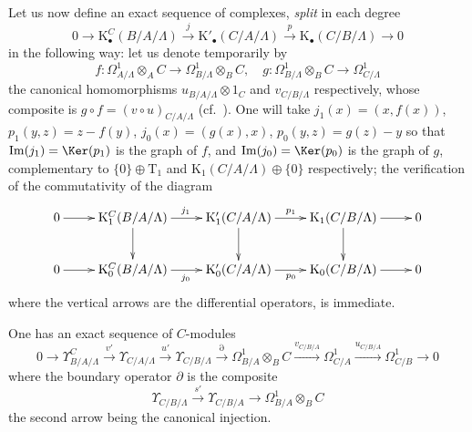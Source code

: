\begin{env}[20.6.16]
\label{0.20.6.16}
Let us now define an exact sequence of complexes, \emph{split} in each degree
\begin{equation}
\tag{20.6.16.1}
  \label{0.20.6.16.1}
  0\to\mathrm{K}^C_\bullet(B/A/\Lambda)\xrightarrow{j}\mathrm{K}'_\bullet(C/A/\Lambda)\xrightarrow{p}\mathrm{K}_\bullet(C/B/\Lambda)\to 0
\end{equation}
in the following way: let us denote temporarily by
\[
  f:\Omega^1_{A/\Lambda}\otimes_A C\to\Omega^1_{B/\Lambda}\otimes_B C, \quad
  g:\Omega^1_{B/\Lambda}\otimes_B C\to\Omega^1_{C/\Lambda}
\]
the canonical homomorphisms $u_{B/A/\Lambda}\otimes 1_C$ and $v_{C/B/\Lambda}$ respectively, whose composite is $g\circ f=(v\circ u)_{C/A/\Lambda}$ (cf.\ ).
One will take $j_1(x)=(x,f(x))$, $p_1(y,z)=z-f(y)$, $j_0(x)=(g(x),x)$, $p_0(y,z)=g(z)-y$ so that $\operatorname{Im}(j_1)=\Ker(p_1)$ is the graph of $f$, and $\operatorname{Im}(j_0)=\Ker(p_0)$ is the graph of $g$, complementary to $\{0\}\oplus\mathrm{T}_1$ and $\mathrm{K}_1(C/A/\Lambda)\oplus\{0\}$ respectively; the verification of the commutativity of the diagram
\[
\xymatrix{
  0 \ar[r] & \mathrm{K}^C_1(B/A/\Lambda) \ar[r]^{j_1} \ar[d] & \mathrm{K}'_1(C/A/\Lambda) \ar[r]^{p_1} \ar[d] & \mathrm{K}_1(C/B/\Lambda) \ar[r] \ar[d] & 0 \\
  0 \ar[r] & \mathrm{K}^C_0(B/A/\Lambda) \ar[r]_{j_0} & \mathrm{K}'_0(C/A/\Lambda) \ar[r]_{p_0} & \mathrm{K}_0(C/B/\Lambda) \ar[r] & 0
}
\]
where the vertical arrows are the differential operators, is immediate.
\end{env}

\begin{theorem}[20.6.17]
\label{0.20.6.17}
One has an exact sequence of $C$-modules
\begin{equation}
\tag{20.6.17.1}
  \label{0.20.6.17.1}
  0\to\Upsilon^C_{B/A/\Lambda}\xrightarrow{v'}\Upsilon_{C/A/\Lambda}\xrightarrow{u'}\Upsilon_{C/B/\Lambda}\xrightarrow{\partial}\Omega^1_{B/A}\otimes_B C\xrightarrow{v_{C/B/A}}\Omega^1_{C/A}\xrightarrow{u_{C/B/A}}\Omega^1_{C/B}\to 0
\end{equation}
where the boundary operator $\partial$ is the composite
\begin{equation}
\tag{20.6.17.2}
  \label{0.20.6.17.2}
  \Upsilon_{C/B/\Lambda}\xrightarrow{s'}\Upsilon_{C/B/A}\to\Omega^1_{B/A}\otimes_B C
\end{equation}
the second arrow being the canonical injection.
\end{theorem}

